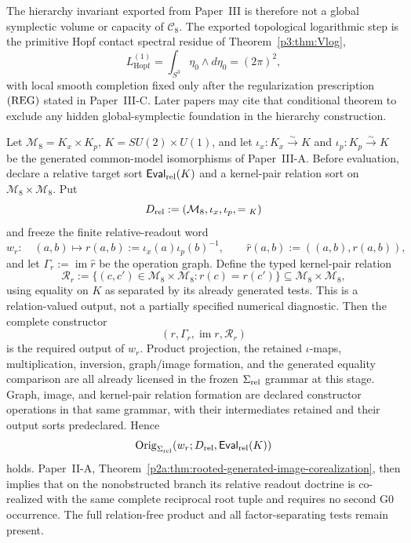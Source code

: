 \documentclass[12pt,a4paper]{article}
\begin{document}
\begin{remark}
\label{p3:rem:downstream-hierarchy-export}
The hierarchy invariant exported from Paper~III is therefore not a global symplectic volume or
capacity of \(\mathcal C_8\).  The exported topological logarithmic step is the primitive Hopf
contact spectral residue of Theorem~\ref{p3:thm:Vlog},
\[
L_{\mathrm{Hopf}}^{(1)}
=\int_{S^3}\eta_0\wedge d\eta_0
=(2\pi)^2,
\]
with local smooth completion fixed only after the regularization prescription
\(({\rm REG})\) stated in Paper~III-C.  Later papers may cite that conditional theorem to
exclude any hidden global-symplectic foundation in the hierarchy construction.
\end{remark}

\begin{theorem}
\label{p3b:thm:relative-readout-admission}
Let \(\mathcal M_8=K_x\times K_p\),
\(K=SU(2)\times U(1)\), and let
\(\iota_x:K_x\xrightarrow{\sim}K\) and
\(\iota_p:K_p\xrightarrow{\sim}K\) be the generated common-model
isomorphisms of Paper~III-A.  Before evaluation, declare a relative target
sort \(\mathsf{Eval}_{\rm rel}(K)\) and a kernel-pair relation sort on
\(\mathcal M_8\times\mathcal M_8\).  Put
\[
 D_{\rm rel}:=(\mathcal M_8,\iota_x,\iota_p,={}_K)
\]
and freeze the finite relative-readout word
\[
 w_r:\quad
 (a,b)\longmapsto
 r(a,b):=\iota_x(a)\iota_p(b)^{-1},
 \qquad
 \widehat r(a,b):=((a,b),r(a,b)),
\]
and let \(\Gamma_r:=\operatorname{im}\widehat r\) be the operation graph.
Define the typed kernel-pair relation
\[
 \mathcal R_r
 :=\bigl\{(c,c')\in\mathcal M_8\times\mathcal M_8:
 r(c)=r(c')\bigr\}
 \subseteq\mathcal M_8\times\mathcal M_8,
\]
using equality on \(K\) as separated by its already generated tests.  This is
a relation-valued output, not a partially specified numerical diagnostic.
Then
the complete constructor
\[
 (r,\Gamma_r,\operatorname{im}r,\mathcal R_r)
\]
is the required output of \(w_r\).  Product projection, the retained
\(\iota\)-maps, multiplication, inversion, graph/image formation, and the
generated equality comparison are all already licensed in the frozen
\(\Sigma_{\rm rel}\) grammar at this stage.  Graph, image, and kernel-pair
relation formation are declared constructor operations in that same grammar,
with their intermediates retained and their output sorts predeclared.  Hence
\[
 \operatorname{Orig}_{\Sigma_{\rm rel}}
 (w_r;D_{\rm rel},\mathsf{Eval}_{\rm rel}(K))
\]
holds.  Paper~II-A,
Theorem~\ref{p2a:thm:rooted-generated-image-corealization}, then implies that
on the nonobstructed branch its
relative readout doctrine is co-realized with the same complete reciprocal
root tuple and requires no second G0 occurrence.  The full relation-free
product and all factor-separating tests remain present.


\end{theorem}
\end{document}
